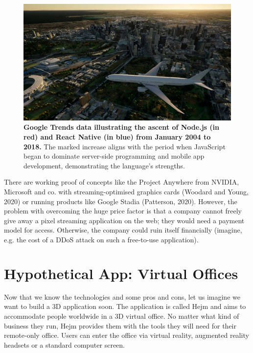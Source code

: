 \documentclass[10pt]{article}
\begin{document}
\begin{sloppypar}
  \begin{figure}[ht]
    \centering
    \includegraphics[width=\textwidth]{figures/project-anywhere.jpg}
    \caption[Google Trends data illustrating the ascent of Node.js and React Native.]{\textbf{Google Trends data illustrating the ascent of Node.js (in red) and React Native (in blue) from January 2004 to 2018.} The marked increase aligns with the period when JavaScript began to dominate server-side programming and mobile app development, demonstrating the language’s strengths.}
    \label{fig:project-anywhere}
  \end{figure}

  There are working proof of concepts like the Project Anywhere from NVIDIA, Microsoft and co. with streaming-optimised graphics cards (Woodard and Young, 2020) or running products like Google Stadia (Patterson, 2020). However, the problem with overcoming the huge price factor is that a company cannot freely give away a pixel streaming application on the web; they would need a payment model for access. Otherwise, the company could ruin itself financially (imagine, e.g. the cost of a DDoS attack on such a free-to-use application).

  \section{Hypothetical App: Virtual Offices}
  \label{sec:hypothetical-app-virtual-offices}

  Now that we know the technologies and some pros and cons, let us imagine we want to build a 3D application soon. The application is called Hejm and aims to accommodate people worldwide in a 3D virtual office. No matter what kind of business they run, Hejm provides them with the tools they will need for their remote-only office. Users can enter the office via virtual reality, augmented reality headsets or a standard computer screen.


\end{sloppypar}
\end{document}
